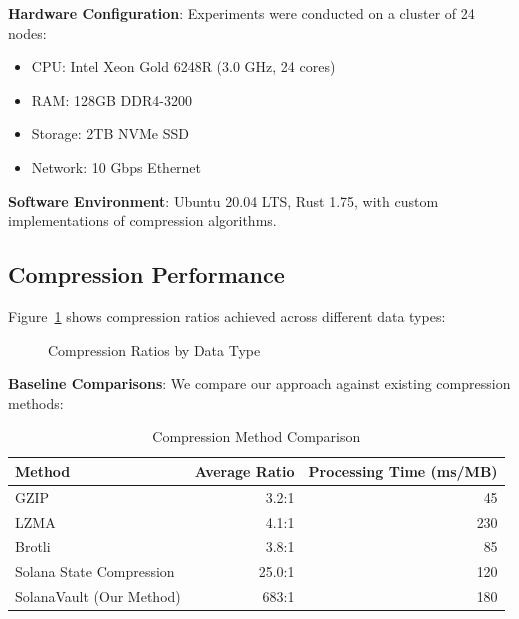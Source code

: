 \documentclass[11pt,a4paper]{article}
\begin{document}
\textbf{Hardware Configuration}: Experiments were conducted on a cluster of 24 nodes:
\begin{itemize}
\item CPU: Intel Xeon Gold 6248R (3.0 GHz, 24 cores)
\item RAM: 128GB DDR4-3200
\item Storage: 2TB NVMe SSD
\item Network: 10 Gbps Ethernet
\end{itemize}

\textbf{Software Environment}: Ubuntu 20.04 LTS, Rust 1.75, with custom implementations of compression algorithms.

\subsection{Compression Performance}

Figure~\ref{fig:compression_ratios} shows compression ratios achieved across different data types:

\begin{figure}[H]
\centering
{}
\caption{Compression Ratios by Data Type}
\label{fig:compression_ratios}
\end{figure}

\textbf{Baseline Comparisons}: We compare our approach against existing compression methods:

\begin{table}[H]
\centering
\caption{Compression Method Comparison}
\begin{tabular}{@{}lrr@{}}
\toprule
Method & Average Ratio & Processing Time (ms/MB) \\
\midrule
GZIP & 3.2:1 & 45 \\
LZMA & 4.1:1 & 230 \\
Brotli & 3.8:1 & 85 \\
Solana State Compression & 25.0:1 & 120 \\
SolanaVault (Our Method) & 683:1 & 180 \\
\bottomrule
\end{tabular}
\end{table}
\end{document}
